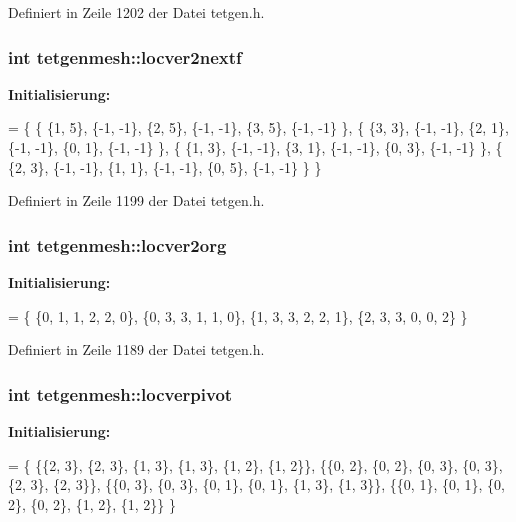 Definiert in Zeile 1202 der Datei tetgen.\-h.

\hypertarget{classtetgenmesh_a3c0df45153809c966fdbfb9d5c21c196}{
\subsubsection[{locver2nextf}]{\setlength{\rightskip}{0pt plus 5cm}int tetgenmesh\-::locver2nextf\hspace{0.3cm}{\ttfamily [static]}}}\label{classtetgenmesh_a3c0df45153809c966fdbfb9d5c21c196}
{\bfseries Initialisierung\-:}
\begin{DoxyCode}
= \{
  \{ \{1, 5\}, \{-1, -1\}, \{2, 5\}, \{-1, -1\}, \{3, 5\}, \{-1, -1\} \},
  \{ \{3, 3\}, \{-1, -1\}, \{2, 1\}, \{-1, -1\}, \{0, 1\}, \{-1, -1\} \},
  \{ \{1, 3\}, \{-1, -1\}, \{3, 1\}, \{-1, -1\}, \{0, 3\}, \{-1, -1\} \},
  \{ \{2, 3\}, \{-1, -1\}, \{1, 1\}, \{-1, -1\}, \{0, 5\}, \{-1, -1\} \}
\}
\end{DoxyCode}


Definiert in Zeile 1199 der Datei tetgen.\-h.

\hypertarget{classtetgenmesh_a499b15cecc1ec34f5344c76374e76039}{
\subsubsection[{locver2org}]{\setlength{\rightskip}{0pt plus 5cm}int tetgenmesh\-::locver2org\hspace{0.3cm}{\ttfamily [static]}}}\label{classtetgenmesh_a499b15cecc1ec34f5344c76374e76039}
{\bfseries Initialisierung\-:}
\begin{DoxyCode}
= \{
  \{0, 1, 1, 2, 2, 0\},
  \{0, 3, 3, 1, 1, 0\},
  \{1, 3, 3, 2, 2, 1\},
  \{2, 3, 3, 0, 0, 2\} 
\}
\end{DoxyCode}


Definiert in Zeile 1189 der Datei tetgen.\-h.

\hypertarget{classtetgenmesh_a98727eeffe416b960d345e6e2ac29482}{
\subsubsection[{locverpivot}]{\setlength{\rightskip}{0pt plus 5cm}int tetgenmesh\-::locverpivot\hspace{0.3cm}{\ttfamily [static]}}}\label{classtetgenmesh_a98727eeffe416b960d345e6e2ac29482}
{\bfseries Initialisierung\-:}
\begin{DoxyCode}
= \{
  \{\{2, 3\}, \{2, 3\}, \{1, 3\}, \{1, 3\}, \{1, 2\}, \{1, 2\}\},
  \{\{0, 2\}, \{0, 2\}, \{0, 3\}, \{0, 3\}, \{2, 3\}, \{2, 3\}\},
  \{\{0, 3\}, \{0, 3\}, \{0, 1\}, \{0, 1\}, \{1, 3\}, \{1, 3\}\},
  \{\{0, 1\}, \{0, 1\}, \{0, 2\}, \{0, 2\}, \{1, 2\}, \{1, 2\}\}
\}
\end{DoxyCode}


